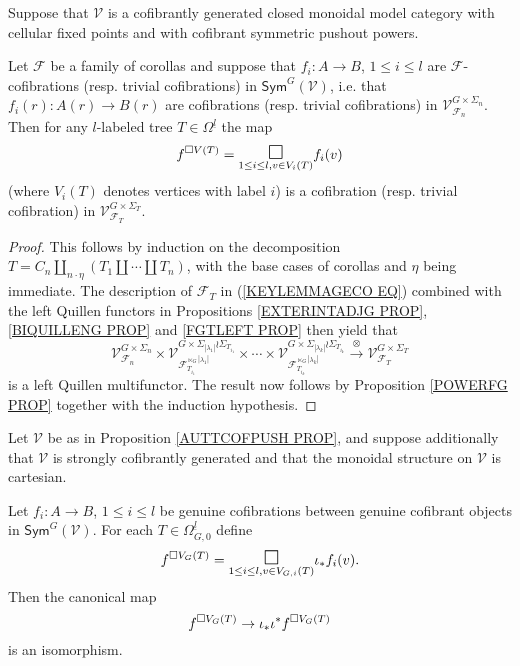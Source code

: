 \documentclass[a4paper,10pt]{article}%
\begin{document}
\begin{proposition}\label{AUTTCOFPUSH PROP}
	Suppose that $\mathcal{V}$ is a cofibrantly generated closed monoidal model category with cellular fixed points and with cofibrant symmetric pushout powers.

	Let $\mathcal{F}$ be a family of corollas 
	and suppose that 
	$f_i \colon A \to B$, $1\leq i \leq l$ are $\mathcal{F}$-cofibrations (resp. trivial cofibrations)
	in $\mathsf{Sym}^G(\mathcal{V})$, i.e. that 
	$f_i(r) \colon A(r) \to B(r)$ are cofibrations (resp. trivial cofibrations) in 
	$\mathcal{V}^{G \times \Sigma_n}_{\mathcal{F}_n}$.
	Then for any $l$-labeled tree $T \in \Omega^{\underline{l}}$ the map
	\[
	f^{\square V(T)} = 
		\underset{1\leq i \leq l, v \in V_i(T)}{\mathlarger{\mathlarger{\square}}}
	f_i(v)\]
	(where $V_i(T)$ denotes vertices with label $i$) is a cofibration (resp. trivial cofibration) in 
	$\mathcal{V}^{G \times \Sigma_T}_{\mathcal{F}_T}$.
\end{proposition}


\begin{proof}
	This follows by induction on the decomposition 
	$T= C_n \amalg_{n \cdot \eta}(T_1 \amalg \cdots \amalg T_n)$, 
	with the base cases of corollas and $\eta$ being immediate.
	The description of $\mathcal{F}_T$ in (\ref{KEYLEMMAGECO EQ}) combined with the left Quillen functors in 
	Propositions \ref{EXTERINTADJG PROP}, \ref{BIQUILLENG PROP} and \ref{FGTLEFT PROP} then yield that 
\[
	\mathcal{V}^{G \times \Sigma_n}_{\mathcal{F}_n}	
		\times
	\mathcal{V}
	^{G \times \Sigma_{|\lambda_1|}\wr \Sigma_{T_{i_1}}}
	_{\mathcal{F}_{T_{i_1}}^{\ltimes_G |\lambda_1|}}
		\times \cdots \times
	\mathcal{V}
	^{G \times \Sigma_{|\lambda_k|}\wr \Sigma_{T_{i_k}}}
	_{\mathcal{F}_{T_{i_k}}^{\ltimes_G |\lambda_k|}}
		\xrightarrow{\otimes}
	\mathcal{V}^{G \times \Sigma_T}_{\mathcal{F}_T}
\]
is a left Quillen multifunctor.
The result now follows by Proposition \ref{POWERFG PROP} together with the induction hypothesis.
\end{proof}



\begin{proposition}\label{FIXPT PROP}
	Let $\mathcal{V}$ be as in Proposition \ref{AUTTCOFPUSH PROP}, and suppose additionally that 
	$\mathcal{V}$ is strongly cofibrantly generated
	and that the monoidal structure on $\mathcal{V}$ is cartesian.

	Let  
	$f_i \colon A \to B$, $1\leq i \leq l$ be 
	genuine cofibrations between genuine cofibrant objects in 
	$\mathsf{Sym}^G(\mathcal{V})$. 
	For each $T \in \Omega_{G,0}^{\underline{l}}$ define
	\begin{equation}
	f^{\square V_G(T)} = 
		\underset{1\leq i \leq l, v \in V_{G,i}(T)}{\mathlarger{\mathlarger{\square}}}
	\iota_{\**}f_i(v).
	\end{equation}
	Then the canonical map
	\begin{equation}\label{FIXEDPOINT1 EQ}
	f^{\square V_G(T)} \to
	\iota_{\**} \iota^{\**} f^{\square V_G(T)}
	\end{equation}
is an isomorphism.	
\end{proposition}
\end{document}
